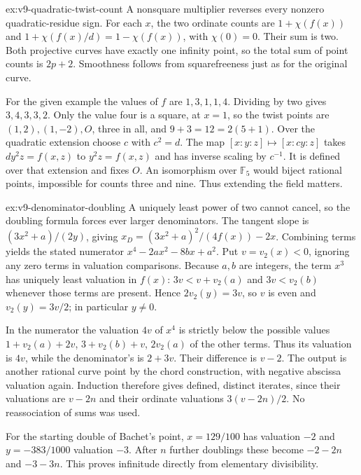 \begin{solution}{ex:v9-quadratic-twist-count}
\idea A nonsquare multiplier reverses every nonzero quadratic-residue sign.
\writeup For each $x$, the two ordinate counts are $1+\chi(f(x))$ and $1+\chi(f(x)/d)=1-\chi(f(x))$, with $\chi(0)=0$. Their sum is two. Both projective curves have exactly one infinity point, so the total sum of point counts is $2p+2$. Smoothness follows from squarefreeness just as for the original curve.

For the given example the values of $f$ are $1,3,1,1,4$. Dividing by two gives $3,4,3,3,2$. Only the value four is a square, at $x=1$, so the twist points are $(1,2),(1,-2),O$, three in all, and $9+3=12=2(5+1)$. Over the quadratic extension choose $c$ with $c^2=d$. The map $[x:y:z]\mapsto[x:cy:z]$ takes $dy^2z=f(x,z)$ to $y^2z=f(x,z)$ and has inverse scaling by $c^{-1}$. It is defined over that extension and fixes $O$. An isomorphism over $\mathbb F_5$ would biject rational points, impossible for counts three and nine. Thus extending the field matters.
\end{solution}
\begin{solution}{ex:v9-denominator-doubling}
\idea A uniquely least power of two cannot cancel, so the doubling formula forces ever larger denominators.
\writeup The tangent slope is $(3x^2+a)/(2y)$, giving $x_D=(3x^2+a)^2/(4f(x))-2x$. Combining terms yields the stated numerator $x^4-2ax^2-8bx+a^2$. Put $v=v_2(x)<0$, ignoring any zero terms in valuation comparisons. Because $a,b$ are integers, the term $x^3$ has uniquely least valuation in $f(x)$: $3v<v+v_2(a)$ and $3v<v_2(b)$ whenever those terms are present. Hence $2v_2(y)=3v$, so $v$ is even and $v_2(y)=3v/2$; in particular $y\ne0$.

In the numerator the valuation $4v$ of $x^4$ is strictly below the possible values $1+v_2(a)+2v$, $3+v_2(b)+v$, $2v_2(a)$ of the other terms. Thus its valuation is $4v$, while the denominator's is $2+3v$. Their difference is $v-2$. The output is another rational curve point by the chord construction, with negative abscissa valuation again. Induction therefore gives defined, distinct iterates, since their valuations are $v-2n$ and their ordinate valuations $3(v-2n)/2$. No reassociation of sums was used.

For the starting double of Bachet's point, $x=129/100$ has valuation $-2$ and $y=-383/1000$ valuation $-3$. After $n$ further doublings these become $-2-2n$ and $-3-3n$. This proves infinitude directly from elementary divisibility.
\end{solution}
